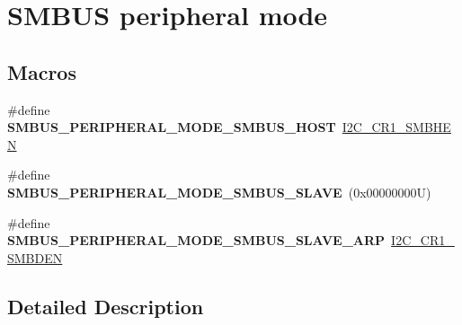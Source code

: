 \hypertarget{group___s_m_b_u_s__peripheral__mode}{}\section{S\+M\+B\+US peripheral mode}
\label{group___s_m_b_u_s__peripheral__mode}
\subsection*{Macros}
\begin{DoxyCompactItemize}
\item 
\mbox{\label{group___s_m_b_u_s__peripheral__mode_ga219f1a9519ebb3c12bc21045fb5fbacc}} 
\#define {\bfseries S\+M\+B\+U\+S\+\_\+\+P\+E\+R\+I\+P\+H\+E\+R\+A\+L\+\_\+\+M\+O\+D\+E\+\_\+\+S\+M\+B\+U\+S\+\_\+\+H\+O\+ST}~\hyperlink{group___peripheral___registers___bits___definition_gaca44767df3368d7f0a9a17c20c55d27b}{I2\+C\+\_\+\+C\+R1\+\_\+\+S\+M\+B\+H\+EN}
\item 
\mbox{\label{group___s_m_b_u_s__peripheral__mode_ga58135a2226dc75d5627434bcc72d69d5}} 
\#define {\bfseries S\+M\+B\+U\+S\+\_\+\+P\+E\+R\+I\+P\+H\+E\+R\+A\+L\+\_\+\+M\+O\+D\+E\+\_\+\+S\+M\+B\+U\+S\+\_\+\+S\+L\+A\+VE}~(0x00000000\+U)
\item 
\mbox{\label{group___s_m_b_u_s__peripheral__mode_gacbcd4481e0cf3e1b58b43604b78f5645}} 
\#define {\bfseries S\+M\+B\+U\+S\+\_\+\+P\+E\+R\+I\+P\+H\+E\+R\+A\+L\+\_\+\+M\+O\+D\+E\+\_\+\+S\+M\+B\+U\+S\+\_\+\+S\+L\+A\+V\+E\+\_\+\+A\+RP}~\hyperlink{group___peripheral___registers___bits___definition_ga656e66b079528ed6d5c282010e51a263}{I2\+C\+\_\+\+C\+R1\+\_\+\+S\+M\+B\+D\+EN}
\end{DoxyCompactItemize}


\subsection{Detailed Description}
